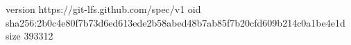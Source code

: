 version https://git-lfs.github.com/spec/v1
oid sha256:2b0c4e80f7b73d6ed613ede2b58abed48b7ab85f7b20cfd609b214c0a1be4e1d
size 393312
